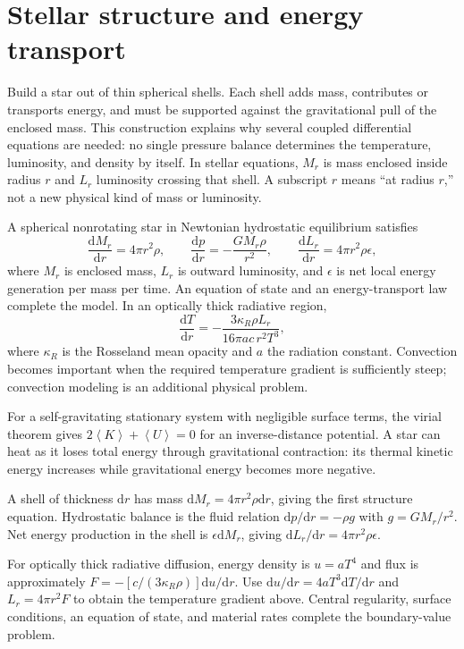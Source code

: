\documentclass[11pt,oneside]{book}
\newcommand{\dd}{\mathrm{d}}
\newcommand{\avg}[1]{\left\langle #1\right\rangle}
\newcommand{\od}[2]{\frac{\dd #1}{\dd #2}}
\theoremstyle{reviewstyle}
\begin{document}
\section{Stellar structure and energy transport}
Build a star out of thin spherical shells. Each shell adds mass, contributes or transports energy, and must be supported against the gravitational pull of the enclosed mass. This construction explains why several coupled differential equations are needed: no single pressure balance determines the temperature, luminosity, and density by itself. In stellar equations, $M_r$ is mass enclosed inside radius $r$ and $L_r$ luminosity crossing that shell. A subscript $r$ means ``at radius $r$,'' not a new physical kind of mass or luminosity.

A spherical nonrotating star in Newtonian hydrostatic equilibrium satisfies
\begin{equation}\od{M_r}{r}=4\pi r^2\rho,\qquad \od{p}{r}=-\frac{GM_r\rho}{r^2},\qquad \od{L_r}{r}=4\pi r^2\rho\epsilon,\end{equation}
where $M_r$ is enclosed mass, $L_r$ is outward luminosity, and $\epsilon$ is net local energy generation per mass per time. An equation of state and an energy-transport law complete the model. In an optically thick radiative region,
\begin{equation}\od{T}{r}=-\frac{3\kappa_R\rho L_r}{16\pi ac\,r^2T^3},\end{equation}
where $\kappa_R$ is the Rosseland mean opacity and $a$ the radiation constant. Convection becomes important when the required temperature gradient is sufficiently steep; convection modeling is an additional physical problem.

For a self-gravitating stationary system with negligible surface terms, the virial theorem gives $2\avg K+\avg U=0$ for an inverse-distance potential. A star can heat as it loses total energy through gravitational contraction: its thermal kinetic energy increases while gravitational energy becomes more negative.

A shell of thickness $\dd r$ has mass $\dd M_r=4\pi r^2\rho\dd r$, giving the first structure equation. Hydrostatic balance is the fluid relation $\dd p/\dd r=-\rho g$ with $g=GM_r/r^2$. Net energy production in the shell is $\epsilon\dd M_r$, giving $\dd L_r/\dd r=4\pi r^2\rho\epsilon$.

For optically thick radiative diffusion, energy density is $u=aT^4$ and flux is approximately $F=-[c/(3\kappa_R\rho)]\dd u/\dd r$. Use $\dd u/\dd r=4aT^3\dd T/\dd r$ and $L_r=4\pi r^2F$ to obtain the temperature gradient above. Central regularity, surface conditions, an equation of state, and material rates complete the boundary-value problem.
\end{document}
